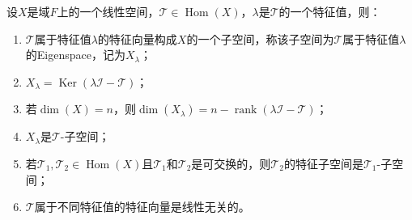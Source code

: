 \begin{property}\label{prop:LinearTransformationEigenspace}
	设$X$是域$F$上的一个线性空间，$\mathcal{T}\in\operatorname{Hom}(X)$，$\lambda$是$\mathcal{T}$的一个特征值，则：
	\begin{enumerate}
		\item $\mathcal{T}$属于特征值$\lambda$的特征向量构成$X$的一个子空间，称该子空间为$\mathcal{T}$属于特征值$\lambda$的\gls{Eigenspace}，记为$X_{\lambda}$；
		\item $X_{\lambda}=\operatorname{Ker}(\lambda\mathcal{I}-\mathcal{T})$；
		\item 若$\dim(X)=n$，则$\dim(X_{\lambda})=n-\operatorname{rank}(\lambda\mathcal{I}-\mathcal{T})$；
		\item $X_{\lambda}$是$\mathcal{T}$-子空间；
		\item 若$\mathcal{T}_1,\mathcal{T}_2\in\operatorname{Hom}(X)$且$\mathcal{T}_1$和$\mathcal{T}_2$是可交换的，则$\mathcal{T}_2$的特征子空间是$\mathcal{T}_1$-子空间；
		\item $\mathcal{T}$属于不同特征值的特征向量是线性无关的。
	\end{enumerate}
\end{property}
